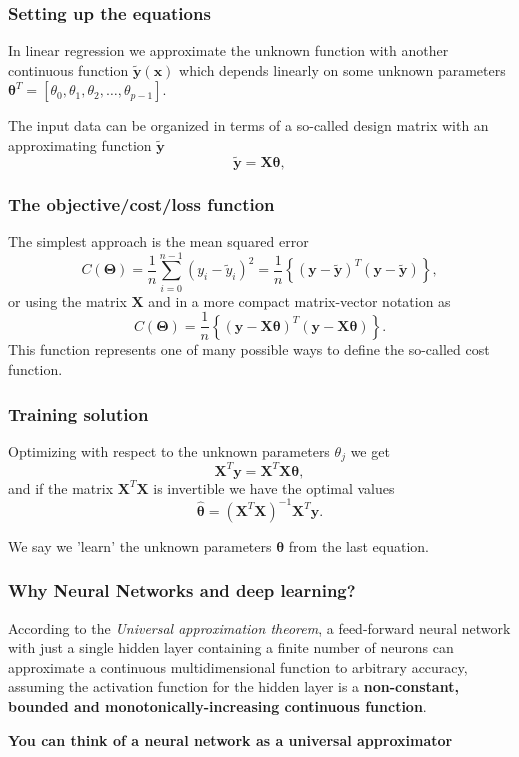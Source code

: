 \documentclass{beamer}
\begin{document}
\begin{frame}
\frametitle{Setting up the equations}

In linear regression we approximate the unknown function with another
continuous function $\tilde{\bm{y}}(\bm{x})$ which depends linearly on
some unknown parameters
$\bm{\theta}^T=[\theta_0,\theta_1,\theta_2,\dots,\theta_{p-1}]$.

The input data can be organized in terms of a so-called design matrix 
with an approximating function $\bm{\tilde{y}}$ 
\[
\bm{\tilde{y}}= \bm{X}\bm{\theta},
\]
\end{frame}

\begin{frame}
\frametitle{The objective/cost/loss function}

The  simplest approach is the mean squared error
\[
C(\bm{\Theta})=\frac{1}{n}\sum_{i=0}^{n-1}\left(y_i-\tilde{y}_i\right)^2=\frac{1}{n}\left\{\left(\bm{y}-\bm{\tilde{y}}\right)^T\left(\bm{y}-\bm{\tilde{y}}\right)\right\},
\]
or using the matrix $\bm{X}$ and in a more compact matrix-vector notation as
\[
C(\bm{\Theta})=\frac{1}{n}\left\{\left(\bm{y}-\bm{X}\bm{\theta}\right)^T\left(\bm{y}-\bm{X}\bm{\theta}\right)\right\}.
\]
This function represents one of many possible ways to define the so-called cost function.
\end{frame}

\begin{frame}
\frametitle{Training solution}

Optimizing with respect to the unknown parameters $\theta_j$ we get 
\[
\bm{X}^T\bm{y} = \bm{X}^T\bm{X}\bm{\theta},  
\]
and if the matrix $\bm{X}^T\bm{X}$ is invertible we have the optimal values
\[
\hat{\bm{\theta}} =\left(\bm{X}^T\bm{X}\right)^{-1}\bm{X}^T\bm{y}.
\]

We say we 'learn' the unknown parameters $\bm{\theta}$ from the last equation.
\end{frame}


\begin{frame}
\frametitle{Why Neural Networks and deep learning?}
\begin{block}{}
According to the \emph{Universal approximation theorem}, a feed-forward
neural network with just a single hidden layer containing a finite
number of neurons can approximate a continuous multidimensional
function to arbitrary accuracy, assuming the activation function for
the hidden layer is a \textbf{non-constant, bounded and
monotonically-increasing continuous function}.
\end{block}
\begin{block}{}
\textbf{You can think of a neural network as a universal approximator}
\end{block}
\end{frame}
\end{document}
